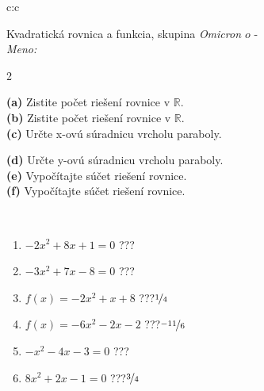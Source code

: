 \documentclass[10pt]{report}
\newcommand\omicron{o}
\begin{document}
\begin{tabular}{c:c}
\begin{minipage}[c][104.5mm][t]{0.5\linewidth}
\begin{center}
\vspace{7mm}
{\huge {\LARGE Kvadratická rovnica a funkcia}, skupina \textit{Omicron $\omicron$} -}\\[5mm]
\textit{Meno:}\phantom{xxxxxxxxxxxxxxxxxxxxxxxxxxxxxxxxxxxxxxxxxxxxxxxxxxxxxxxxxxxxxxxxx}\\[5mm]
\begin{minipage}{0.95\linewidth}
\begin{center}
{\small \begin{multicols}{2} \raggedright
\textbf{(a)} Zistite počet riešení rovnice v \(\mathbb{R}\). \\[1mm]
\textbf{(b)} Zistite počet riešení rovnice v \(\mathbb{R}\). \\[1mm]
\textbf{(c)} Určte x-ovú súradnicu vrcholu paraboly. \par \columnbreak
\textbf{(d)} Určte y-ovú súradnicu vrcholu paraboly. \\[1mm]
\textbf{(e)} Vypočítajte súčet riešení rovnice. \\[1mm]
\textbf{(f)} Vypočítajte súčet riešení rovnice.
\end{multicols}
}
\end{center}
\end{minipage}
\\[4mm]
\begin{minipage}{0.79\linewidth}
\begin{center}
\begin{varwidth}{\linewidth}
\begin{enumerate}
\Large
\item $-2x^2+8x+1=0$\quad \dotfill\; ???\;\dotfill {}
\item $-3x^2+7x-8=0$\quad \dotfill\; ???\;\dotfill {}
\item $f(x)=-2x^2+x+8$\quad \dotfill\; ???\;\dotfill \quad $\nicefrac{1}{4}$
\item $f(x)=-6x^2-2x-2$\quad \dotfill\; ???\;\dotfill \quad $\nicefrac{-11}{6}$
\item $-x^2-4x-3=0$\quad \dotfill\; ???\;\dotfill {}
\item $8x^2+2x-1=0$\quad \dotfill\; ???\;\dotfill \quad $\nicefrac{3}{4}$
\end{enumerate}
\end{varwidth}
\end{center}

\end{minipage}
\end{center}
\end{minipage}
\end{tabular}
\end{document}
